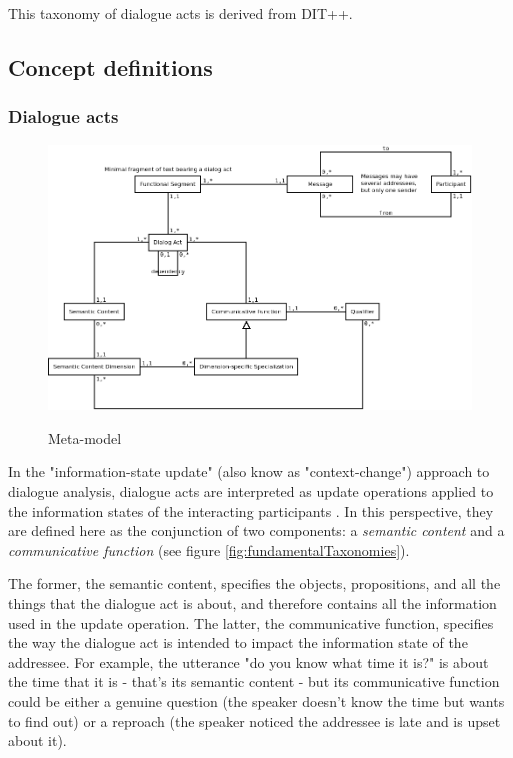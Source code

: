 This taxonomy of dialogue acts is derived from DIT++\cite{bunt2009dit++}.

\subsection{Concept definitions}
\label{subsec:dialogue_acts}

\subsubsection{Dialogue acts}

\begin{figure}
	\caption{Meta-model}
	\centering
	\includegraphics[keepaspectratio,width=0.6\paperwidth]{figures/objects.png}
	\label{fig:metaModel}
\end{figure}

In the "information-state update" (also know as "context-change") approach to dialogue analysis, dialogue acts are interpreted as update operations applied to the information states of the interacting participants \cite{traum2003information,bunt2011semantics}. In this perspective, they are defined here as the conjunction of two components: a \textit{semantic content} and a \textit{communicative function} (see figure \ref{fig:fundamentalTaxonomies}).

The former, the semantic content, specifies the objects, propositions, and all the things that the dialogue act is about, and therefore contains all the information used in the update operation. The latter, the communicative function, specifies the way the dialogue act is intended to impact the information state of the addressee. For example, the utterance "do you know what time it is?" is about the time that it is - that's its semantic content - but its communicative function could be either a genuine question (the speaker doesn't know the time but wants to find out) or a reproach (the speaker noticed the addressee is late and is upset about it).


